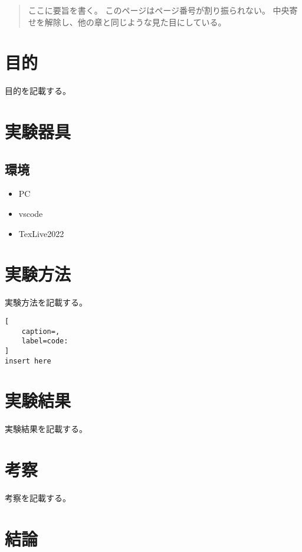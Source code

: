 \documentclass[titlepage]{jlreq}
\begin{document}
\begin{abstract}

ここに要旨を書く。
このページはページ番号が割り振られない。
中央寄せを解除し、他の章と同じような見た目にしている。

\end{abstract} 


\section{目的}

目的を記載する。

\section{実験器具}

\subsection{環境}

\begin{itemize}
    \item PC
    \item vscode
    \item TexLive2022
  \end{itemize}

\section{実験方法}

実験方法を記載する。

\begin{lstlisting}[
    caption=,
    label=code:
]
insert here
\end{lstlisting}

\section{実験結果}

実験結果を記載する。

\section{考察}

考察を記載する。


\section{結論}
\end{document}
